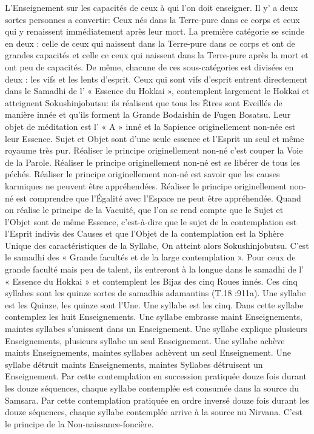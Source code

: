 L'Enseignement sur les capacités de ceux à qui l'on doit enseigner.
Il y’ a deux sortes personnes a convertir: Ceux nés dans la Terre-pure dans ce corps et ceux qui y renaissent immédiatement après leur mort. La première catégorie se scinde en deux : celle de ceux qui naissent dans la Terre-pure dans ce corps et ont de grandes capacités et celle ce ceux qui naissent dans la Terre-pure après la mort et ont peu de capacités. De même, chacune de ces sous-catégories est divisées en deux : les vifs et les lents d’esprit.
Ceux qui sont vifs d’esprit entrent directement dans le Samadhi de l’ « Essence du Hokkai », contemplent largement le Hokkai et atteignent Sokushinjobutsu: ils réalisent que tous les Êtres sont Eveillés de manière innée et qu’ils forment la Grande Bodaishin de Fugen Bosatsu. Leur objet de méditation est l' « A » inné et la Sapience originellement non-née est leur Essence. Sujet et Objet sont d’une seule essence et l’Esprit un seul et même royaume très pur. Réaliser le principe originellement non-né c'est couper la Voie de la Parole. Réaliser le principe originellement non-né est se libérer de tous les péchés. Réaliser le principe originellement non-né est savoir que les causes karmiques ne peuvent être appréhendées. Réaliser le principe originellement non-né est comprendre que l’Égalité avec l’Espace ne peut être appréhendée.
Quand on réalise le principe de la Vacuité, que l’on se rend compte que le Sujet et l’Objet sont de même Essence, c'est-à-dire que le sujet de la contemplation est l’Esprit indivis des Causes et que l’Objet de la contemplation est la Sphère Unique des caractéristiques de la Syllabe, On atteint alors Sokushinjobutsu. C’est le samadhi des « Grande facultés et de la large contemplation ».
Pour ceux de grande faculté mais peu de talent, ils entreront à la longue dans le samadhi de l’ « Essence du Hokkai » et contemplent les Bijas des cinq Roues innés. Ces cinq syllabes sont les quinze sortes de samadhis adamantins (T.18 :911a). Une syllabe est les Quinze, les quinze sont l’Une.
Une syllabe est les cinq. Dans cette syllabe contemplez les huit Enseignements. Une syllabe embrasse maint Enseignements, maintes syllabes s’unissent dans un Enseignement. Une syllabe explique plusieurs Enseignements, plusieurs syllabe un seul Enseignement. Une syllabe achève maints Enseignements, maintes syllabes achèvent un seul Enseignement. Une syllabe détruit maints Enseignements, maintes Syllabes détruisent un Enseignement. Par cette contemplation en succession pratiquée douze fois durant les douze séquences, chaque syllabe contemplée est consumée dans la source du Samsara. Par cette contemplation pratiquée en ordre inversé douze fois durant les douze séquences, chaque syllabe contemplée arrive à la source nu Nirvana. C’est le principe de la Non-naissance-foncière.
